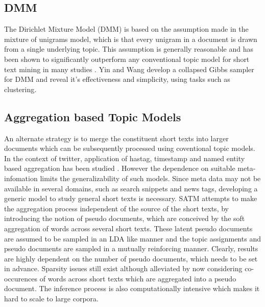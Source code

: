 \documentclass{sig-alternate-05-2015}
\begin{document}
\subsection{DMM}
The Dirichlet Mixture Model (DMM) is based on the assumption made in the mixture of unigrams model, which is that every unigram in a document is drawn from a single underlying topic. This assumption is generally reasonable and has been shown to significantly outperform any conventional topic model for short text mining in many studies \cite{btm, zhao}. Yin and Wang \cite{dmm} develop a collapsed Gibbs sampler for DMM and reveal it's effectiveness and simplicity, using tasks such as clustering.
\subsection{Aggregation based Topic Models}
An alternate strategy is to merge the constituent short texts into larger documents which can be subsequently processed using coventional topic models. In the context of twitter, application of hastag, timestamp and named entity based aggregation has been studied \cite{mehrotra, zhao}. However the dependence on suitable meta-infomation limits the generalizability of such models. Since meta data may not be available in several domains, such as search snippets and news tags, developing a generic model to study general short texts is necessary. SATM\cite{satm} attempts to make the aggregation process independent of the source of the short texts, by introducing the notion of pseudo documents, which are conceived by the soft aggregation of words across several short texts. These latent pseudo documents are assumed to be sampled in an LDA like manner and the topic assignments and pseudo documents are sampled in a mutually reinforcing manner. Clearly, results are highly dependent on the number of pseudo documents, which needs to be set in advance. Sparsity issues still exist although alleviated by now considering co-occurences of words across short texts which are aggregated into a pseudo document. The inference process is also computationally intensive which makes it hard to scale to large corpora.
\end{document}
